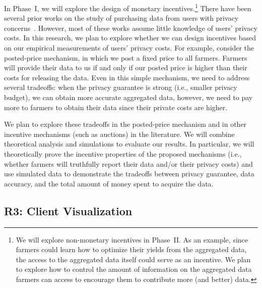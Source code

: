 In Phase~I, we will explore the design of monetary
incentives.\footnote{We  %
will explore non-monetary incentives in Phase~II. 
As an example, since farmers could learn
how to optimize their yields from the aggregated data, the access to the
aggregated data itself could serve as an incentive. 
We plan to explore how to control the amount of information on the aggregated data
farmers can access to encourage them to contribute 
more (and better) data.} %
There have been several prior works on the study of purchasing data from 
users with privacy concerns~\cite{CCK+16,GR11,LL+14,LR12,X13}. 
However, most of these works assume little knowledge of users' privacy costs.
In this research, we plan to explore whether we can design incentives
based on our empirical measurements of users' privacy costs.
For example, consider the posted-price mechanism, 
in which we post a fixed price to all farmers.
Farmers will provide their data to us if and only if our posted price is higher
than their costs for releasing the data.
Even in this simple mechanism, we need to address several tradeoffs:
when the privacy guarantee is strong (i.e., smaller privacy budget), 
we can obtain more accurate aggregated data, however, 
we need to pay more to farmers to obtain their data since their private costs 
are higher. 

We plan to explore these tradeoffs in the posted-price mechanism and in
other incentive mechanisms (such as auctions) in the literature. 
We will combine theoretical analysis and simulations to
evaluate our results. In particular, we will theoretically prove the incentive
properties of the proposed mechanisms (i.e., whether farmers will truthfully 
report their data and/or their privacy costs) and use simulated data to 
demonstrate the tradeoffs between privacy guarantee, data accuracy, and the total
amount of money spent to acquire the data.



\subsection{R3: Client Visualization}
\label{sec:vis}

